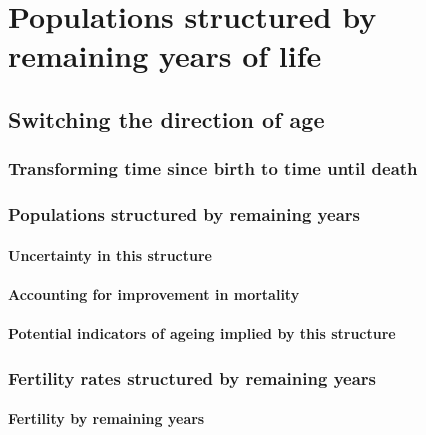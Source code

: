 \part*{Populations structured by remaining years of life}
  \chapter{Switching the direction of age}
  
  
  \section{Transforming time since birth to time until death}
    
   
  \section{Populations structured by remaining years}
    
    \subsection{Uncertainty in this structure}
      
    \subsection{Accounting for improvement in mortality}
      
    \subsection{Potential indicators of ageing implied by this structure}
      
  \section{Fertility rates structured by remaining years}
    
    
    \subsection{Fertility by remaining years}
      
      
